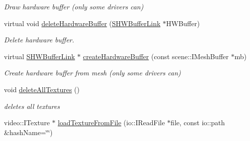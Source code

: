 \begin{DoxyCompactItemize}
\begin{DoxyCompactList}\small\item\em Draw hardware buffer (only some drivers can) \end{DoxyCompactList}\item 
\hypertarget{classirr_1_1video_1_1_c_null_driver_a6e22b60b40214b6ed40ab95969874641}{virtual void \hyperlink{classirr_1_1video_1_1_c_null_driver_a6e22b60b40214b6ed40ab95969874641}{delete\-Hardware\-Buffer} (\hyperlink{structirr_1_1video_1_1_c_null_driver_1_1_s_h_w_buffer_link}{S\-H\-W\-Buffer\-Link} $\ast$H\-W\-Buffer)}\label{classirr_1_1video_1_1_c_null_driver_a6e22b60b40214b6ed40ab95969874641}

\begin{DoxyCompactList}\small\item\em Delete hardware buffer. \end{DoxyCompactList}\item 
\hypertarget{classirr_1_1video_1_1_c_null_driver_a9e6ded286ab06cb926d676a1d02077b6}{virtual \hyperlink{structirr_1_1video_1_1_c_null_driver_1_1_s_h_w_buffer_link}{S\-H\-W\-Buffer\-Link} $\ast$ \hyperlink{classirr_1_1video_1_1_c_null_driver_a9e6ded286ab06cb926d676a1d02077b6}{create\-Hardware\-Buffer} (const scene\-::\-I\-Mesh\-Buffer $\ast$mb)}\label{classirr_1_1video_1_1_c_null_driver_a9e6ded286ab06cb926d676a1d02077b6}

\begin{DoxyCompactList}\small\item\em Create hardware buffer from mesh (only some drivers can) \end{DoxyCompactList}\item 
\hypertarget{classirr_1_1video_1_1_c_null_driver_a9aff3c3fd97d769cfa973c7463d5267b}{void \hyperlink{classirr_1_1video_1_1_c_null_driver_a9aff3c3fd97d769cfa973c7463d5267b}{delete\-All\-Textures} ()}\label{classirr_1_1video_1_1_c_null_driver_a9aff3c3fd97d769cfa973c7463d5267b}

\begin{DoxyCompactList}\small\item\em deletes all textures \end{DoxyCompactList}\item 
\hypertarget{classirr_1_1video_1_1_c_null_driver_a2c4e22876663c7e4d69356384a1bf3a3}{video\-::\-I\-Texture $\ast$ \hyperlink{classirr_1_1video_1_1_c_null_driver_a2c4e22876663c7e4d69356384a1bf3a3}{load\-Texture\-From\-File} (io\-::\-I\-Read\-File $\ast$file, const io\-::path \&hash\-Name=\char`\"{}\char`\"{})}\label{classirr_1_1video_1_1_c_null_driver_a2c4e22876663c7e4d69356384a1bf3a3}


\end{DoxyCompactItemize}
